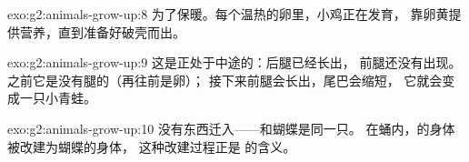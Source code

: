 \begin{solution}{exo:g2:animals-grow-up:8}
为了保暖。每个温热的卵里，小鸡正在发育，
靠卵黄提供营养，直到准备好破壳而出。
\end{solution}

\begin{solution}{exo:g2:animals-grow-up:9}
这是正处于中途的：后腿已经长出，
前腿还没有出现。之前它是没有腿的（再往前是卵）；
接下来前腿会长出，尾巴会缩短，
它就会变成一只小青蛙。
\end{solution}

\begin{solution}{exo:g2:animals-grow-up:10}
没有东西迁入——和蝴蝶是同一只。
在蛹内，的身体被改建为蝴蝶的身体，
这种改建过程正是
的含义。
\end{solution}
